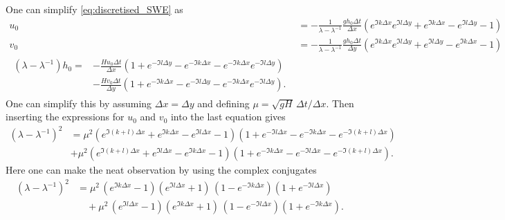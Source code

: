 One can simplify \autoref{eq:discretised_SWE} as
\begin{subequations}
\begin{align*}
u_0 &= -\frac{1}{\lambda - \lambda^{-1}} \frac{g h_0 \Delta t}{\Delta x} \left(e^{\mathfrak{I}k \Delta x}e^{\mathfrak{I}l \Delta y}+ e^{\mathfrak{I}k\Delta x} - e^{\mathfrak{I}l \Delta y}-1\right) \\
v_0 &= -\frac{1}{\lambda - \lambda^{-1}} \frac{gh_0\Delta t}{\Delta y} \left(e^{\mathfrak{I}k \Delta x}e^{\mathfrak{I}l \Delta y}+ e^{\mathfrak{I}l\Delta y} - e^{\mathfrak{I}k \Delta x}-1\right) \\
\begin{split}
    \left(\lambda - \lambda^{-1}\right) h_0 = &- \frac{Hu_0\Delta t}{\Delta x}  \left(1+e^{-\mathfrak{I}l \Delta y} - e^{-\mathfrak{I}k \Delta x}- e^{-\mathfrak{I}k \Delta x}e^{-\mathfrak{I}l \Delta y}\right)  \\ 
    &- \frac{Hv_0\Delta t}{\Delta y}\left(1+e^{-\mathfrak{I}k \Delta x} - e^{-\mathfrak{I}l \Delta y}- e^{-\mathfrak{I}k \Delta x}e^{-\mathfrak{I}l \Delta y}\right).
\end{split}
\end{align*}
\end{subequations}
One can simplify this by assuming $\Delta x = \Delta y$ and defining $\mu = \sqrt{gH}\,\Delta t/\Delta x$. Then inserting the expressions for $u_0$ and $v_0$ into the last equation gives
\begin{equation*}
    \begin{split}
    \left(\lambda - \lambda^{-1}\right)^2 &= \mu^2 \left(e^{\mathfrak{I}(k+l) \Delta x}+ e^{\mathfrak{I}k\Delta x} - e^{\mathfrak{I}l \Delta x}-1\right)\left(1+e^{-\mathfrak{I}l \Delta x} - e^{-\mathfrak{I}k \Delta x}- e^{-\mathfrak{I}(k+l) \Delta x}\right) \\ 
    &
    + \mu^2 \left(e^{\mathfrak{I}(k+l) \Delta x}+ e^{\mathfrak{I}l\Delta x} - e^{\mathfrak{I}k \Delta x}-1\right)\left(1+e^{-\mathfrak{I}k \Delta x} - e^{-\mathfrak{I}l \Delta x}- e^{-\mathfrak{I}(k+l) \Delta x}\right).
    \end{split}
\end{equation*}
Here one can make the neat observation by using the complex conjugates
\begin{equation*}
\begin{split}
(\lambda - \lambda^{-1})^2
&= \mu^2 \,(e^{\mathfrak{I}k\Delta x}-1)(e^{\mathfrak{I}l\Delta x}+1)
\,(1 - e^{-\mathfrak{I}k\Delta x})(1 + e^{-\mathfrak{I}l\Delta x}) \\
&\quad
+ \mu^2 \,(e^{\mathfrak{I}l\Delta x}-1)(e^{\mathfrak{I}k\Delta x}+1)
\,(1 - e^{-\mathfrak{I}l\Delta x})(1 + e^{-\mathfrak{I}k\Delta x}).
\end{split}
\end{equation*}
